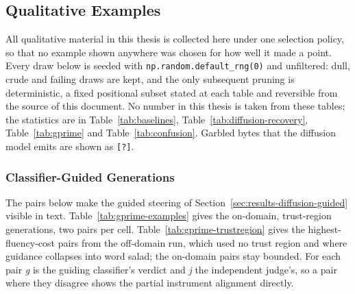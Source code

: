 \clearpage
\subsection{Qualitative Examples}
\label{app:gprime-examples}
\label{app:showcase}

All qualitative material in this thesis is collected here under one selection policy, so that no example shown anywhere was chosen for how well it made a point. Every draw below is seeded with \texttt{np.random.default\_rng(0)} and unfiltered: dull, crude and failing draws are kept, and the only subsequent pruning is deterministic, a fixed positional subset stated at each table and reversible from the source of this document. No number in this thesis is taken from these tables; the statistics are in Table~\ref{tab:baselines}, Table~\ref{tab:diffusion-recovery}, Table~\ref{tab:gprime} and Table~\ref{tab:confusion}. Garbled bytes that the diffusion model emits are shown as \texttt{[?]}.


\subsubsection{Classifier-Guided Generations}
\label{app:examples-guided}
The pairs below make the guided steering of Section~\ref{sec:results-diffusion-guided} visible in text. Table~\ref{tab:gprime-examples} gives the on-domain, trust-region generations, two pairs per cell. Table~\ref{tab:gprime-trustregion} gives the highest-fluency-cost pairs from the off-domain run, which used no trust region and where guidance collapses into word salad; the on-domain pairs stay bounded. For each pair \emph{g} is the guiding classifier's verdict and \emph{j} the independent judge's, so a pair where they disagree shows the partial instrument alignment directly.


\clearpage


\clearpage
